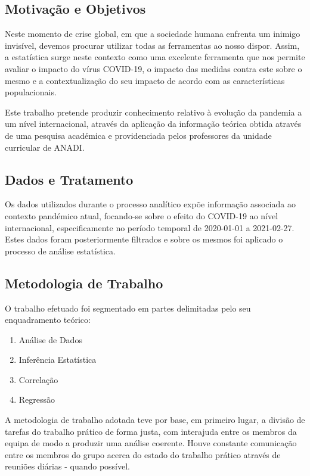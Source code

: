 \documentclass[conference]{IEEEtran}
\begin{document}
\subsection{Motivação e Objetivos}

Neste momento de crise global, em que a sociedade humana enfrenta um inimigo invisível, devemos procurar utilizar todas as ferramentas ao nosso dispor. Assim, a estatística surge neste contexto como uma excelente ferramenta que nos permite avaliar o impacto do vírus COVID-19, o impacto das medidas contra este sobre o mesmo e a contextualização do seu impacto de acordo com as características populacionais.

Este trabalho pretende produzir conhecimento relativo à evolução da pandemia a um nível internacional, através da aplicação da informação teórica obtida através de uma pesquisa académica e providenciada pelos professores da unidade curricular de ANADI.

\subsection{Dados e Tratamento}

Os dados utilizados durante o processo analítico expõe informação associada ao contexto pandémico atual, focando-se sobre o efeito do COVID-19 ao nível internacional, especificamente no período temporal de 2020-01-01 a 2021-02-27. Estes dados foram posteriormente filtrados e sobre os mesmos foi aplicado o processo de análise estatística.

\subsection{Metodologia de Trabalho}

O trabalho efetuado foi segmentado em partes delimitadas pelo seu enquadramento teórico:

\begin{enumerate}
\item Análise de Dados
\item Inferência Estatística
\item Correlação 
\item Regressão
\end{enumerate}

A metodologia de trabalho adotada teve por base, em primeiro lugar, a divisão de tarefas do trabalho prático de forma justa, com interajuda entre os membros da equipa de modo a produzir uma análise coerente. Houve constante comunicação entre os membros do grupo acerca do estado do trabalho prático através de reuniões diárias - quando possível. 
\end{document}
